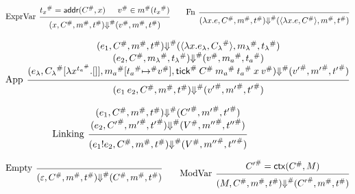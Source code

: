 \documentclass[acmsmall,screen,review]{acmart}
\theoremstyle{definition}
\newcommand*{\A}[1]{{#1}^{\#}}
\newcommand*{\mem}{m}
\newcommand*{\link}[2]{{#1}\mathtt{!}{#2}}
\newcommand*{\addr}{\mathsf{addr}}
\newcommand*{\tick}{\mathsf{tick}}
\newcommand*{\modctx}{\mathsf{ctx}}
\begin{document}
\begin{figure}[htb]
  \footnotesize
  \[
    \begin{prooftree}
      \hypo{\A{t_{x}}=\addr(\A{C},x)}
      \hypo{\A{v}\in\A{\mem}(\A{t_{x}})}
      \infer[left label=ExprVar]2{
      (x, \A{C}, \A{\mem}, \A{t})
      \A{\Downarrow}
      (\A{v}, \A{\mem}, \A{t})
      }
    \end{prooftree}\qquad
    \begin{prooftree}
      \infer[left label=Fn]0{
      (\lambda x.e, \A{C}, \A{\mem}, \A{t})
      \A{\Downarrow}
      (\langle\lambda x.e, \A{C}\rangle, \A{\mem}, \A{t})
      }
    \end{prooftree}
  \]

  \[
    \begin{prooftree}
      \hypo{
        \begin{matrix}
          (e_{1}, \A{C}, \A{\mem}, \A{t})
          \A{\Downarrow}
          (\langle\lambda x.e_{\lambda}, \A{C_{\lambda}}\rangle, \A{\mem_{\lambda}}, \A{t_{\lambda}}) \\
          (e_{2}, \A{C}, \A{\mem_{\lambda}}, \A{t_{\lambda}})
          \A{\Downarrow}
          (\A{v}, \A{\mem_{a}}, \A{t_{a}})                                                            \\
          (e_{\lambda}, \A{C_{\lambda}}[\lambda x^{\A{t_{a}}}.[]], \A{\mem_{a}}[\A{t_{a}}\A{\mapsto} \A{v}], \A{\tick}\:\A{C}\:\A{\mem_a}\:\A{t_{a}}\:x\:\A{v})
          \A{\Downarrow}
          (\A{v'}, \A{\mem'},\A{t'})
        \end{matrix}
      }
      \infer[left label={App}]1{
      (e_{1}\:e_{2}, \A{C}, \A{\mem}, \A{t})
      \A{\Downarrow}
      (\A{v'}, \A{\mem'},\A{t'})
      }
    \end{prooftree}
  \]

  \[
    \begin{prooftree}
      \hypo{
        \begin{matrix}
          (e_{1}, \A{C}, \A{\mem}, \A{t})
          \A{\Downarrow}
          (\A{C'}, \A{\mem'}, \A{t'}) \\
          (e_{2}, \A{C'}, \A{\mem'}, \A{t'})
          \A{\Downarrow}
          (\A{V}, \A{\mem''}, \A{t''})
        \end{matrix}
      }
      \infer[left label=Linking]1{
      (\link{e_{1}}{e_{2}}, \A{C}, \A{\mem}, \A{t})
      \A\Downarrow
      (\A{V}, \A{\mem''}, \A{t''})
      }
    \end{prooftree}
  \]

  \[
    \begin{prooftree}
      \infer[left label=Empty]0{
      (\varepsilon, \A{C}, \A{\mem}, \A{t})
      \A{\Downarrow}
      (\A{C}, \A{\mem}, \A{t})
      }
    \end{prooftree}\qquad
    \begin{prooftree}
      \hypo{\A{C'}=\modctx(\A{C},M)}
      \infer[left label=ModVar]1{
      (M, \A{C}, \A{\mem}, \A{t})
      \A{\Downarrow}
      (\A{C'}, \A{\mem}, \A{t})
      }
    \end{prooftree}
  \]


\end{figure}
\end{document}
